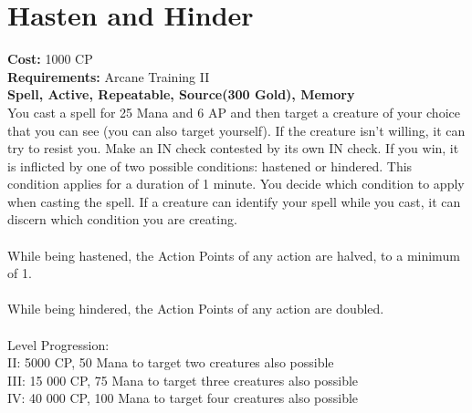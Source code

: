 \section{Hasten and Hinder}
\textbf{Cost:} 1000 CP\\
\textbf{Requirements:} Arcane Training II\\
\textbf{Spell, Active, Repeatable, Source(300 Gold), Memory}\\
You cast a spell for 25 Mana and 6 AP and then target a creature of your choice that you can see (you can also target yourself). If the creature isn’t willing, it can try to resist you. Make an IN check contested by its own IN check. If you win, it is inflicted by one of two possible conditions: hastened or hindered. This condition applies for a duration of 1 minute. You decide which condition to apply when casting the spell. If a creature can identify your spell while you cast, it can discern which condition you are creating.\\
\\
While being hastened, the Action Points of any action are halved, to a minimum of 1.\\
\\
While being hindered, the Action Points of any action are doubled.\\
\\
Level Progression:\\
II: 5000 CP, 50 Mana to target two creatures also possible\\
III: 15 000 CP, 75 Mana to target three creatures also possible\\
IV: 40 000 CP, 100 Mana to target four creatures also possible \\